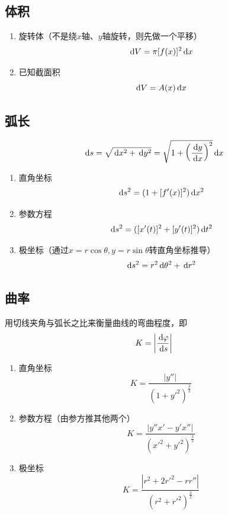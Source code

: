 \subsection{体积}
\begin{enumerate}
	\item 旋转体（不是绕$x$轴、$y$轴旋转，则先做一个平移）
\[\,\mathrm{d} V=\pi[f(x)]^2\,\mathrm{d} x\]
	\item 已知截面积
\[\,\mathrm{d} V=A(x)\,\mathrm{d} x\]
\end{enumerate}

\subsection{弧长}
\begin{center}
\end{center}
\[\,\mathrm{d} s=\sqrt{\,\mathrm{d} x^2+\,\mathrm{d} y^2}=\sqrt{1+\left(\dfrac{\,\mathrm{d} y}{\,\mathrm{d} x}\right)^2}\,\mathrm{d} x\]
\begin{enumerate}
	\item 直角坐标
	\[\,\mathrm{d} s^2=(1+[f'(x)]^2)\,\mathrm{d} x^2\]
	\item 参数方程
	\[\,\mathrm{d} s^2=([x'(t)]^2+[y'(t)]^2)\,\mathrm{d} t^2\]
	\item 极坐标（通过$x=r\cos\theta,y=r\sin\theta$转直角坐标推导）
	\[\,\mathrm{d} s^2=r^2\,\mathrm{d}\theta^2+\,\mathrm{d} r^2\]
\end{enumerate}

\subsection{曲率}
\begin{definition}[曲率]
用切线夹角与弧长之比来衡量曲线的弯曲程度，即
\[K=\left|\dfrac{\,\mathrm{d}\varphi}{\,\mathrm{d} s}\right|\]
\end{definition}
\begin{enumerate}
	\item 直角坐标
	\[K=\dfrac{|y''|}{(1+y'^2)^\frac{3}{2}}\]
	\item 参数方程（由参方推其他两个）
	\[K=\dfrac{|y''x'-y'x''|}{(x'^2+y'^2)^\frac{3}{2}}\]
	\item 极坐标
	\[K=\dfrac{|r^2+2r'^2-rr''|}{(r^2+r'^2)^\frac{3}{2}}\]
\end{enumerate}

